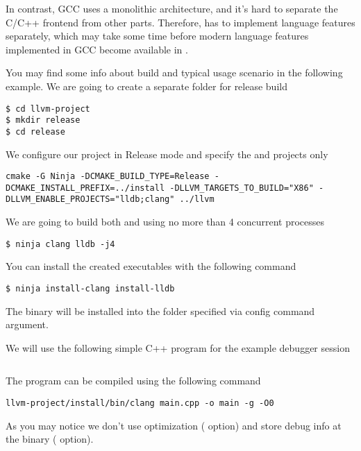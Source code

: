 In contrast, GCC uses a monolithic architecture, and it's hard to separate the
C/C++ frontend from other parts. Therefore, \gdb has to implement
language features separately, which may take some time before modern language
features implemented in GCC become available in \gdb. 

You may find some info about \lldb build and typical usage scenario in the
following example.
We are going to create a separate folder for release build  
\begin{adjustwidth}{0em}{0em}
\begin{verbatim}
$ cd llvm-project
$ mkdir release
$ cd release
\end{verbatim}
\end{adjustwidth}
We configure our project in Release mode and specify the  and
 projects only 
\begin{verbatim}
cmake -G Ninja -DCMAKE_BUILD_TYPE=Release -DCMAKE_INSTALL_PREFIX=../install -DLLVM_TARGETS_TO_BUILD="X86" -DLLVM_ENABLE_PROJECTS="lldb;clang" ../llvm
\end{verbatim}
We are going to build both \clang and \lldb using no more than 4 concurrent
processes 
\begin{adjustwidth}{0em}{0em}
\begin{verbatim}
$ ninja clang lldb -j4
\end{verbatim}
\end{adjustwidth}
You can install the created executables with the following command
\begin{adjustwidth}{0em}{0em}
\begin{verbatim}
$ ninja install-clang install-lldb
\end{verbatim}
\end{adjustwidth}
The binary will be installed into the folder specified via
 config command argument. 

We will use the following simple C++ program for the example debugger session
\inputminted{c++}{./src/part1/ch1_setup/main.cpp}
The program can be compiled using the following command
\begin{adjustwidth}{0em}{0em}
\begin{verbatim}
llvm-project/install/bin/clang main.cpp -o main -g -O0
\end{verbatim}
\end{adjustwidth}
As you may notice we don't use optimization ( option) and store
debug info at the binary ( option).

